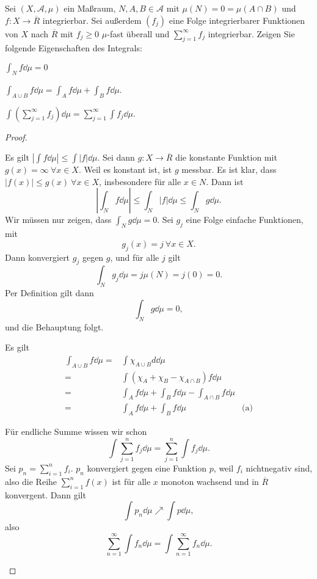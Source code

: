 \begin{Problem}\label{pr:advanalblatt6-2}
	Sei $(X,\mathcal{A},\mu)$ ein Maßraum, $N,A,B\in \mathcal{A}$ mit $\mu(N)=0=\mu(A\cap B)$ und $f:X\to \overline{R}$ integrierbar. Sei außerdem $(f_j)$ eine Folge integrierbarer Funktionen von $X$ nach $\overline{R}$ mit $f_j\ge 0$ $\mu$-fast überall und $\sum_{j=1}^{\infty} f_j$ integrierbar. Zeigen Sie folgende Eigenschaften des Integrals:
	\begin{parts}
	\item $\int_N f\dd{\mu}=0$
	\item $\int_{A\cup B}f\dd{\mu}=\int_A f\dd{\mu}+\int_B f\dd{\mu}$.
	\item $\int \left( \sum_{j=1}^{\infty} f_j \right) \dd{\mu}=\sum_{j=1}^{\infty} \int f_j\dd{\mu}$.
	\end{parts}
\end{Problem}
\begin{proof}
	\begin{parts}
	\item Es gilt $\left| \int f\dd{\mu} \right| \le \int |f|\dd{\mu}$. Sei dann $g:X\to \overline{R}$ die konstante Funktion mit $g(x)=\infty~\forall x\in X$. Weil es konstant ist, ist $g$ messbar. Es ist klar, dass $|f(x)|\le g(x)~\forall x\in X$, insbesondere für alle $x\in N$. Dann ist
		\[
			\left| \int_N f\dd{\mu} \right| \le \int_N |f|\dd{\mu}\le \int_N g\dd{\mu}
		.\] 
		Wir müssen nur zeigen, dass $\int_N g\dd{\mu}=0$. Sei $g_j$ eine Folge einfache Funktionen, mit
		\[
		g_j(x)=j~\forall x\in X
		.\] 
		Dann konvergiert $g_j$ gegen $g$, und f\"{u}r alle $j$ gilt
		\[
			\int_N g_j\dd{\mu}=j\mu(N)=j(0)=0
		.\] 
		Per Definition gilt dann
		\[
			\int_N g\dd{\mu}=0
		,\] 
		und die Behauptung folgt.
	\item Es gilt
		\begin{align*}
			\int_{A\cup B}f\dd{\mu}=& \int \chi_{A\cup B}d\dd{\mu}\\
			=& \int\left( \chi_A+\chi_B-\chi_{A\cap B} \right) f\dd{\mu}\\
			=& \int_A f\dd{\mu}+\int_B f\dd{\mu}-\int_{A\cap B}f\dd{\mu}\\
			=&\int_A f\dd{\mu}+\int_B f\dd{\mu} & \text{(a)}
		\end{align*}
	\item Für endliche Summe wissen wir schon
		\[
			\int \sum_{j=1}^{n} f_j\dd{\mu}=\sum_{j=1}^{n} \int f_j\dd{\mu} 
		.\] 
		Sei $p_n=\sum_{i=1}^n f_i$. $p_n$ konvergiert gegen eine Funktion $p$, weil $f_i$ nichtnegativ sind, also die Reihe $\sum_{i=1}^n f(x)$ ist für alle $x$ monoton wachsend und in $\overline{R}$ konvergent. Dann gilt
		\[
			\int p_n\dd{\mu}\nearrow \int p\dd{\mu}
		,\]
		also
		\[
			\sum_{n=1}^{\infty} \int f_n\dd{\mu}=\int \sum_{n=1}^{\infty} f_n\dd{\mu}
		.\] 
	\end{parts}
\end{proof}

